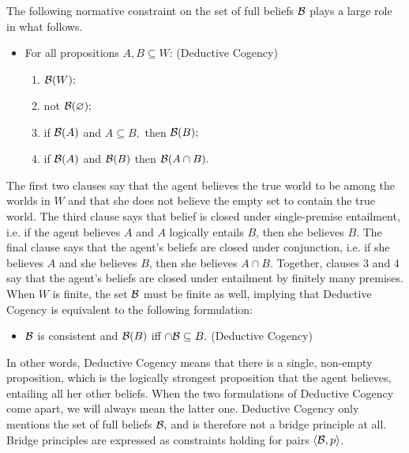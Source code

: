 The following normative constraint on the set of full beliefs $\mathcal{B}$ plays a
large role in what follows.
\begin{itemize}
\item[] For all propositions $A,B \subseteq W$: \hfill(Deductive Cogency)
  \begin{enumerate}
  \item $\mathcal{B}(W);$
  \item not $\mathcal{B}(\varnothing);$
  \item if $\mathcal{B}(A)$ and $A\subseteq B,$ then $\mathcal{B}(B);$
  \item if $\mathcal{B}(A)$ and $\mathcal{B}(B)$ then $\mathcal{B}(A\cap B).$
  \end{enumerate}
\end{itemize}
The first two clauses say that the agent believes the true world to be among the
worlds in $W$ and that she does not believe the empty set to contain the true
world. The third clause says that belief is closed under single-premise
entailment, i.e. if the agent believes $A$ and $A$ logically entails $B$, then
she believes $B$. The final clause says that the agent's beliefs are closed
under conjunction, i.e. if she believes $A$ and she believes $B$, then she
believes $A\cap B.$ Together, clauses 3 and 4 say that the agent's beliefs are
closed under entailment by finitely many premises. When $W$ is finite, the set
$\mathcal{B}$ must be finite as well, implying that Deductive Cogency is equivalent to
the following formulation:
\begin{itemize}
\item[] $\mathcal{B}$ is consistent and $\mathcal{B}(B)$ iff $\cap \mathcal{B} \subseteq B.$ \hfill
(Deductive Cogency)
\end{itemize}
In other words, Deductive Cogency means that there is a single, non-empty
proposition, which is the logically strongest proposition that the agent
believes,  entailing all her other beliefs. When the two formulations of
Deductive Cogency come apart, we will always mean the latter one.%
Deductive Cogency only mentions the set of full beliefs $\mathcal{B},$ and is therefore
not a bridge principle at all. Bridge principles are expressed as constraints
holding for pairs $\langle \mathcal{B},p \rangle$.   

